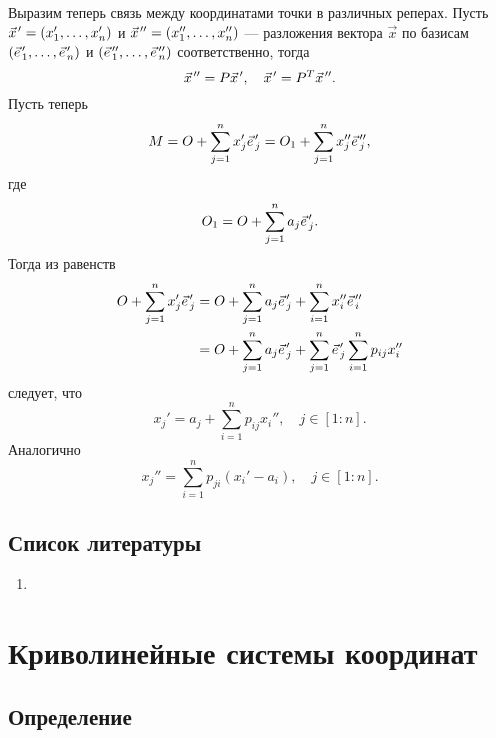 \documentclass{article}
\theoremstyle{definition}
\theoremstyle{plain}
\theoremstyle{remark}
\numberwithin{equation}{section}
\newcommand{\wvec}[1]{\vec{#1}\mkern2mu\vphantom{#1}}
\newcommand{\pvec}[1]{\wvec{#1}'}
\newcommand{\ppvec}[1]{\wvec{#1}''}
\begin{document}
Выразим теперь связь между координатами точки в различных реперах. Пусть
$\pvec{x} = (x_1', \dots, x_n')$ и $\ppvec{x} = (x_1'', \dots, x_n'')$ ---
разложения вектора $\vec{x}$ по базисам $(\pvec{e}_1, \dots, \pvec{e}_n)$ и
$(\ppvec{e}_1, \dots, \ppvec{e}_n)$ соответственно, тогда
\begin{equation*}
  \ppvec{x} = P \pvec{x}, \quad \pvec{x} = P^T \ppvec{x}.
\end{equation*}
Пусть теперь
\begin{equation*}
  M = O + \sum_{j=1}^n x_j' \pvec{e}_j = O_1 + \sum_{j=1}^n x_j'' \ppvec{e}_j,
\end{equation*}
где
\begin{equation*}
  O_1 = O + \sum_{j=1}^n a_j \pvec{e}_j.
\end{equation*}
Тогда из равенств
\begin{equation*}
  \begin{aligned}
    O + \sum_{j=1}^n x_j' \pvec{e}_j &= O + \sum_{j=1}^n a_j \pvec{e}_j +
      \sum_{i=1}^n x_i'' \ppvec{e}_i \\
    &= O + \sum_{j=1}^n a_j \pvec{e}_j +
      \sum_{j=1}^n \pvec{e}_j \sum_{i=1}^n p_{ij} x_i''
  \end{aligned}
\end{equation*}
следует, что
\begin{equation}
  x_j' = a_j + \sum_{i=1}^n p_{ij} x_i'', \quad j \in [1:n].
\end{equation}
Аналогично
\begin{equation}
  x_j'' = \sum_{i=1}^n p_{ji} (x_i' - a_i), \quad j \in [1:n].
\end{equation}

\subsection{Список литературы}
\begin{enumerate}
  \item \cite{lectures}
\end{enumerate}

\pagebreak


\section{Криволинейные системы координат}

\subsection{Определение}
\end{document}
